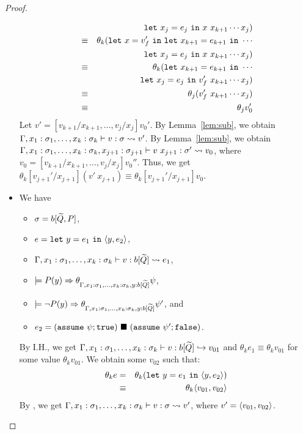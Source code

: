 \begin{proof}
\begin{itemize}
\begin{eqnarray*}
&&\mathtt{let~}x_j=e_j\mathtt{~in~}x\ x_{k+1} \cdots x_j) \\
&\equiv&\theta_k (\mathtt{let~}x=v_f'\mathtt{~in~}\mathtt{let~}x_{k+1}=e_{k+1}\mathtt{~in~}\cdots \\
&&\mathtt{let~}x_j=e_j\mathtt{~in~}x\ x_{k+1} \cdots x_j) \\
&\equiv&\theta_k (\mathtt{let~}x_{k+1}=e_{k+1}\mathtt{~in~}\cdots \\
&&\mathtt{let~}x_j=e_j\mathtt{~in~}v_f'\ x_{k+1} \cdots x_j) \\
&\equiv&\theta_j (v_f'\ x_{k+1} \cdots x_j) \\
&\equiv&\theta_j v_0'
\end{eqnarray*}
Let \(v'=[v_{k+1}/x_{k+1},\dots,v_j/x_j] v_0'\).
By Lemma~\ref{lem:sub}, we obtain
\(\Gamma,x_1:\sigma_1,\dots,x_k:\sigma_k \vdash v : \sigma \leadsto v'\).
By Lemma~\ref{lem:sub}, we obtain
\(\T{\Gamma,x_1:\sigma_1,\dots,x_k:\sigma_k,x_{j+1}:\sigma_{j+1}}{v\ x_{j+1}}{\sigma'}{v_0}\), where
\(v_0=[v_{k+1}/x_{k+1},\dots,v_j/x_j]v_0''\).
%
Thus, we get \(\theta_k[v_{j+1}'/x_{j+1}] (v'\ x_{j+1})\equiv \theta_k[v_{j+1}'/x_{j+1}] v_0\).

\item[] 
We have
\begin{itemize}
\item \(\sigma=b[\widetilde{Q},P]\),
\item \(e=\mathtt{let~}y=e_1\mathtt{~in~}{\langle{y,e_2}\rangle}\),
\item \(\Gamma,x_1:\sigma_1,\dots,x_k:\sigma_k \vdash v : b[\widetilde{Q}] \leadsto e_1\),
\item \(\models P(y) \Rightarrow \theta_{\Gamma,x_1:\sigma_1,\dots,x_k:\sigma_k,y:b[\widetilde{Q}]}\psi\),
\item \(\models \neg P(y) \Rightarrow \theta_{\Gamma,x_1:\sigma_1,\dots,x_k:\sigma_k,y:b[\widetilde{Q}]}\psi'\), and
\item \(e_2=(\mathtt{assume~}\psi; \mathtt{true})\ \blacksquare\ (\mathtt{assume~}\psi'; \mathtt{false})\).
\end{itemize}
By I.H., we get
\(\Gamma,x_1:\sigma_1,\dots,x_k:\sigma_k \vdash v : b[\widetilde{Q}] \hookrightarrow v_{01}\) and
\(\theta_k e_1 \equiv \theta_k v_{01}\) for some value \(\theta_k v_{01}\).
We obtain some \(v_{02}\) such that:
\begin{eqnarray*}
\theta_k e &=& \theta_k(\mathtt{let~}y=e_1\mathtt{~in~}{\langle{y,e_2}\rangle}) \\
&\equiv& \theta_k \langle{v_{01},v_{02}}\rangle
\end{eqnarray*}
By , we get
\(\Gamma,x_1:\sigma_1,\dots,x_k:\sigma_k \vdash v : \sigma \leadsto v'\), where
\(v'=\langle{v_{01},v_{02}}\rangle\).


\end{itemize}
\end{proof}

